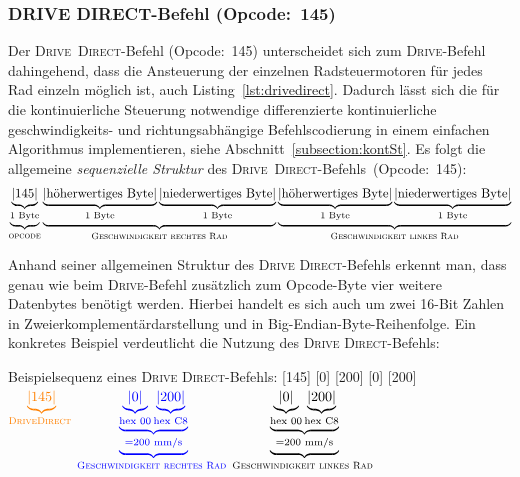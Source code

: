 \subsubsection{\textsc{DRIVE} \textsc{DIRECT}-Befehl (Opcode:~145)}
Der \textsc{Drive}~\textsc{Direct}-Befehl (Opcode:~145) unterscheidet sich zum \og \textsc{Drive}-Befehl dahingehend, dass die Ansteuerung der einzelnen Radsteuermotoren für jedes Rad einzeln möglich ist, \vgl auch Listing~\ref{lst:drivedirect}. Dadurch lässt sich die für die kontinuierliche Steuerung notwendige differenzierte kontinuierliche geschwindigkeits- und richtungsabhängige Befehlscodierung in einem einfachen Algorithmus implementieren, siehe Abschnitt~\ref{subsection:kontSt}. Es folgt die allgemeine \textit{sequenzielle Struktur} des \textsc{Drive}~\textsc{Direct}-Befehls~(Opcode:~145):
\begin{equation*}
\begin{split}
\underbrace{\underbrace{\text{|145|}}_{\substack{\text{\text{1 Byte}}}}}_{\substack{\text{\textsc{opcode}}}} \underbrace{\underbrace{\text{|höherwertiges Byte|}}_{\substack{\text{1 Byte}}} \underbrace{\text{|niederwertiges Byte|}}_{\substack{\text{1 Byte}}}}_{\substack{\text{\textsc{Geschwindigkeit rechtes Rad}}}} \underbrace{\underbrace{\text{|höherwertiges Byte|}}_{\substack{\text{1 Byte}}} \underbrace{\text{|niederwertiges Byte|}}_{\substack{\text{1 Byte}}}}_{\substack{\text{\textsc{Geschwindigkeit linkes Rad}}}}
\end{split}
\end{equation*}

Anhand seiner allgemeinen Struktur des \textsc{Drive} \textsc{Direct}-Befehls erkennt man, dass genau wie beim \textsc{Drive}-Befehl zusätzlich zum Opcode-Byte vier weitere Datenbytes benötigt werden. Hierbei handelt es sich auch um zwei 16-Bit Zahlen in Zweierkomplementärdarstellung und in Big-Endian-Byte-Reihenfolge.
Ein konkretes Beispiel verdeutlicht die Nutzung des \textsc{Drive} \textsc{Direct}-Befehls:

\begin{beispiel}{Beispielsequenz eines \textsc{Drive} \textsc{Direct}-Befehls: [145] [0] [200] [0] [200]} \\
\centering
\(\color{orange}\underbrace{\text{|145|}}_{\substack{\text{\textsc{Drive}\textsc{Direct }}}}\color{blue}\underbrace{\underbrace{\underbrace{\text{|0|}}_{\substack{\text{hex 00}}} \underbrace{\text{|200|}}_{\substack{\text{hex C8}}}}_{\substack{= \text{200 mm/s}}}}_{\substack{\text{\textsc{Geschwindigkeit rechtes Rad }}}} \color{black}\underbrace{\underbrace{\underbrace{\text{|0|}}_{\substack{\text{hex 00}}} \underbrace{\text{|200|}}_{\substack{\text{hex C8}}}}_{\substack{= \text{200 mm/s}}}}_{\substack{\text{\textsc{Geschwindigkeit linkes Rad }}}}\)
\label{exa:driveDirect}
\end{beispiel}

